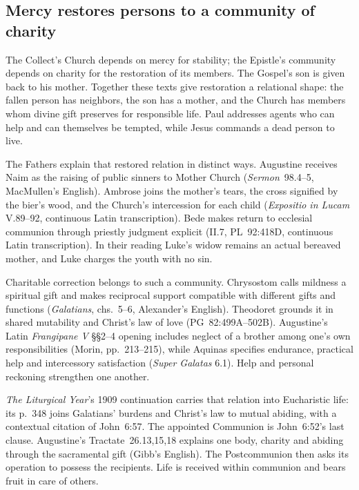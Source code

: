 \subsection*{Mercy restores persons to a community of charity\enspace{}}

The Collect's Church depends on mercy for stability; the Epistle's
community depends on charity for the restoration of its members. The
Gospel's son is given back to his mother. Together these texts give
restoration a relational shape: the fallen person has neighbors, the son
has a mother, and the Church has members whom divine gift preserves for
responsible life. Paul addresses agents who can help and can themselves be
tempted, while Jesus commands a dead person to live.

The Fathers explain that restored relation in distinct ways. Augustine
receives Naim as the raising of public sinners to Mother Church
(\emph{Sermon}~98.4--5, MacMullen's English). Ambrose joins the mother's
tears, the cross signified by the bier's wood, and the Church's
intercession for each child (\emph{Expositio in Lucam} V.89--92,
continuous Latin transcription). Bede makes return to ecclesial communion
through priestly judgment explicit (II.7, PL~92:418D, continuous Latin
transcription). In their reading Luke's widow remains an actual bereaved
mother, and Luke charges the youth with no sin.

Charitable correction belongs to such a community. Chrysostom calls
mildness a spiritual gift and makes reciprocal support compatible with
different gifts and functions (\emph{Galatians}, chs.~5--6,
Alexander's English). Theodoret grounds it in shared mutability and
Christ's law of love (PG~82:499A--502B). Augustine's Latin
\emph{Frangipane V} §§2--4 opening includes neglect of a brother among
one's own responsibilities (Morin, pp.~213--215), while Aquinas
specifies endurance, practical help and intercessory satisfaction
(\emph{Super Galatas} 6.1). Help and personal reckoning strengthen one
another.

\emph{The Liturgical Year}'s 1909 continuation carries that relation into
Eucharistic life: its p.~348 joins Galatians' burdens and Christ's law
to mutual abiding, with a contextual citation of John~6:57.
The appointed Communion is John~6:52's last clause. Augustine's
Tractate~26.13,15,18 explains one body, charity and abiding through the
sacramental gift (Gibb's English). The Postcommunion then asks its operation
to possess the recipients. Life is received within communion and bears
fruit in care of others.

